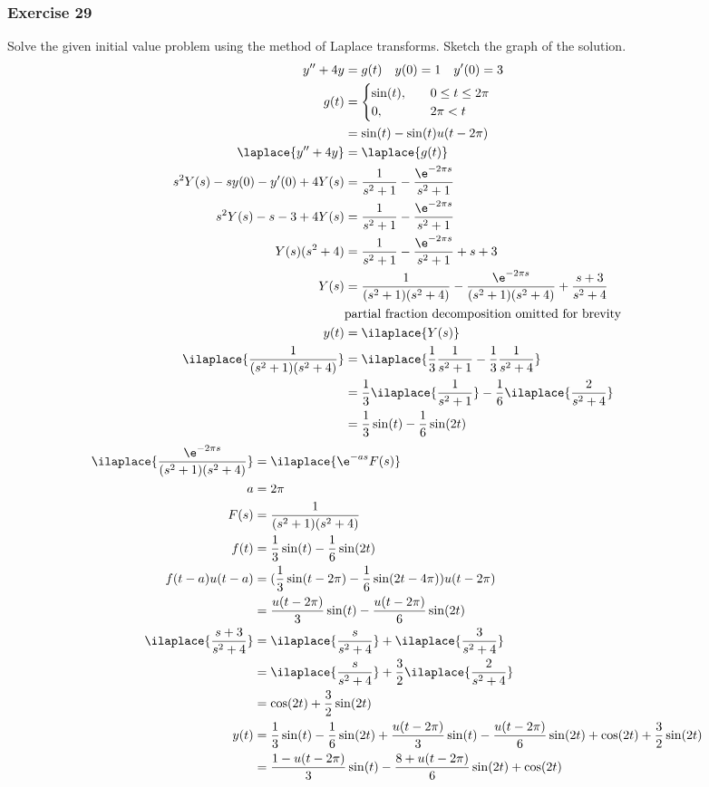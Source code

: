 \documentclass{math}
\begin{document}
\subsubsection*{Exercise 29}
Solve the given initial value problem using the method of Laplace transforms.
Sketch the graph of the solution.
\begin{align*}
  y''+4y &= g(t) \quad y(0) = 1 \quad y'(0) = 3 \\
  g(t) &= \begin{cases}
    \sin(t), &\quad 0\le t\le 2\pi \\
    0, &\quad 2\pi<t
  \end{cases} \\
  &= \sin(t)-\sin(t)u(t-2\pi) \\
  \laplace{y''+4y} &= \laplace{g(t)} \\
  s^2Y(s)-sy(0)-y'(0)+4Y(s) &= \frac{1}{s^2+1}-\frac{\e^{-2\pi s}}{s^2+1} \\
  s^2Y(s)-s-3+4Y(s) &= \frac{1}{s^2+1}-\frac{\e^{-2\pi s}}{s^2+1} \\
  Y(s)(s^2+4) &= \frac{1}{s^2+1}-\frac{\e^{-2\pi s}}{s^2+1}+s+3 \\
  Y(s) &= \frac{1}{(s^2+1)(s^2+4)}-\frac{\e^{-2\pi s}}{(s^2+1)(s^2+4)}+
    \frac{s+3}{s^2+4} \\
  & \text{partial fraction decomposition omitted for brevity} \\
  y(t) &= \ilaplace{Y(s)} \\
  \ilaplace{\frac{1}{(s^2+1)(s^2+4)}} &=
    \ilaplace{\frac{1}{3}\frac{1}{s^2+1}-\frac{1}{3}\frac{1}{s^2+4}} \\
  &= \frac{1}{3}\ilaplace{\frac{1}{s^2+1}}-
    \frac{1}{6}\ilaplace{\frac{2}{s^2+4}} \\
  &= \frac{1}{3}\sin(t)-\frac{1}{6}\sin(2t)
\end{align*}
\begin{align*}
  \ilaplace{\frac{\e^{-2\pi s}}{(s^2+1)(s^2+4)}} &= \ilaplace{\e^{-as}F(s)} \\
  a &= 2\pi \\
  F(s) &= \frac{1}{(s^2+1)(s^2+4)} \\
  f(t) &= \frac{1}{3}\sin(t)-\frac{1}{6}\sin(2t) \\
  f(t-a)u(t-a) &= (\frac{1}{3}\sin(t-2\pi)-\frac{1}{6}\sin(2t-4\pi))u(t-2\pi) \\
  &= \frac{u(t-2\pi)}{3}\sin(t)-\frac{u(t-2\pi)}{6}\sin(2t) \\
  \ilaplace{\frac{s+3}{s^2+4}} &=
    \ilaplace{\frac{s}{s^2+4}}+\ilaplace{\frac{3}{s^2+4}} \\
  &= \ilaplace{\frac{s}{s^2+4}}+\frac{3}{2}\ilaplace{\frac{2}{s^2+4}} \\
  &= \cos(2t)+\frac{3}{2}\sin(2t) \\
  y(t) &= \frac{1}{3}\sin(t)-\frac{1}{6}\sin(2t)+
    \frac{u(t-2\pi)}{3}\sin(t)-\frac{u(t-2\pi)}{6}\sin(2t)+
    \cos(2t)+\frac{3}{2}\sin(2t) \\
  &= \frac{1-u(t-2\pi)}{3}\sin(t)-\frac{8+u(t-2\pi)}{6}\sin(2t)+\cos(2t) \\
\end{align*}
\end{document}
